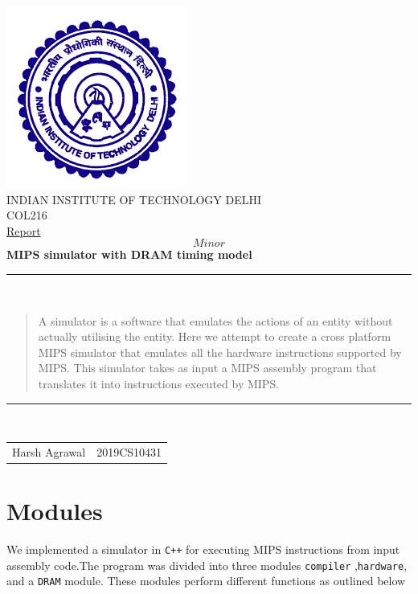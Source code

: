 \documentclass[hidelinks,12pt]{article}
\begin{document}
\begin{titlepage}
    \centering
    \includegraphics[scale=0.5]{../../logo.png}\\[1.0cm]
    \Large INDIAN INSTITUTE OF TECHNOLOGY DELHI\\[1.0 cm]
    \LARGE COL216\\[0.1cm]
    \Large \underline{Report}\\
    \large \[Minor\]
    \LARGE \textbf{MIPS simulator with DRAM timing model}


    \rule{\textwidth}{0.2 mm} \\[0.1cm]
    \begin{abstract}
        A simulator is a software that emulates the actions of an entity without actually utilising the entity.
        Here we attempt to create a cross platform MIPS simulator that emulates all the hardware instructions supported by MIPS.
        This simulator takes as input a MIPS assembly program that translates it into instructions executed by MIPS.
        \\[0.1cm]
    \end{abstract}
    \rule{\textwidth}{0.2 mm} \\[0.1cm]
    \begin{flushright}

        \begin{tabular}{c c}
            \small {Harsh Agrawal} & \small {2019CS10431} \\
        \end{tabular}
    \end{flushright}
\end{titlepage}
\tableofcontents
\newpage

\section{Modules}
We implemented a simulator in \verb|C++| for executing MIPS instructions from input assembly code.The program was divided into three modules \verb|compiler| ,\verb|hardware|, and a \verb|DRAM| module.
These modules perform different functions as outlined below
\end{document}
